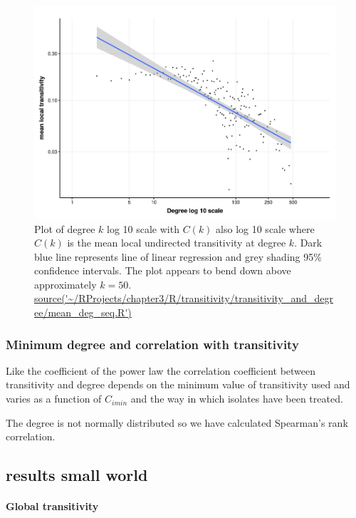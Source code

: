 \begin{figure}
    \centering
    \includegraphics[width=\textwidth]{images/chapter3/ggplot2/c(k)/Rplot_C_k_new_formatted.png}
    \caption[Log10 plot of $C(k)$ against $k$]{Plot of degree $k$ log 10 scale with $C(k)$ also log 10 scale where $C(k)$ is the mean local undirected transitivity at degree $k$. Dark blue line represents line of linear regression and grey shading 95\% confidence intervals. The plot appears to bend down above approximately $k=50$. \url{source('~/RProjects/chapter3/R/transitivity/transitivity_and_degree/mean_deg_seq.R')}}
    \label{fig:C(k)_doublelog}
\end{figure}

\subsubsection{Minimum degree and correlation with transitivity}

Like the coefficient of the power law the correlation coefficient between transitivity and degree depends on the minimum value of transitivity used and varies as a function of $C_{i min}$ and the way in which isolates have been treated.

The degree is not normally distributed so we have calculated Spearman's rank correlation. 


\subsection{results small world}

\paragraph{Global transitivity}


